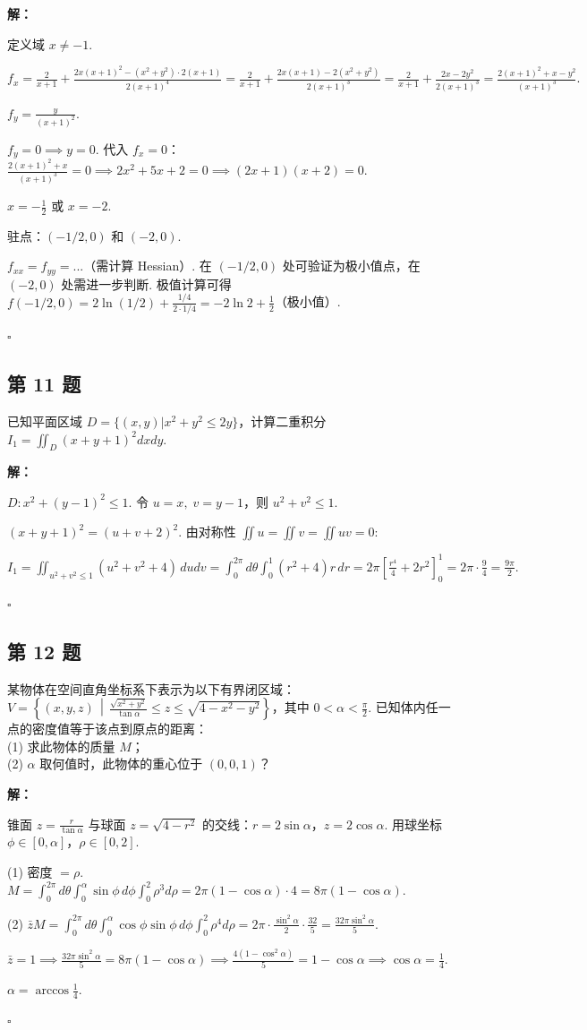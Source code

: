 \documentclass[12pt,a4paper]{article}
\newenvironment{sol}[1][解]{%
  \par\medskip\noindent\textbf{#1：}\itshape\par\noindent\ignorespaces
}{%
  \par\hfill$\square$\par\medskip
}
\begin{document}
\begin{sol}定义域 $x\ne -1$.

  $f_x=\frac{2}{x+1}+\frac{2x(x+1)^2-(x^2+y^2)\cdot
  2(x+1)}{2(x+1)^4}=\frac{2}{x+1}+\frac{2x(x+1)-2(x^2+y^2)}{2(x+1)^3}=\frac{2}{x+1}+\frac{2x-2y^2}{2(x+1)^3}=\frac{2(x+1)^2+x-y^2}{(x+1)^3}.$

  $f_y=\frac{y}{(x+1)^2}$.

  $f_y=0\implies y=0$. 代入 $f_x=0$：$\frac{2(x+1)^2+x}{(x+1)^3}=0\implies
  2x^2+5x+2=0\implies(2x+1)(x+2)=0$.

  $x=-\frac{1}{2}$ 或 $x=-2$.

  驻点：$(-1/2,0)$ 和 $(-2,0)$.

  $f_{xx}=f_{yy}=...$（需计算 Hessian）. 在 $(-1/2,0)$ 处可验证为极小值点，在 $(-2,0)$
  处需进一步判断. 极值计算可得 $f(-1/2,0)=2\ln(1/2)+\frac{1/4}{2\cdot 1/4}=-2\ln
  2+\frac{1}{2}$（极小值）.

\end{sol}
\subsection*{第 11 题}
已知平面区域 $D=\{(x,y)|x^2+y^2\le 2y\}$，计算二重积分 $I_1=\iint_{D}(x+y+1)^2dxdy$.

\begin{sol}$D: x^2+(y-1)^2\le 1$. 令 $u=x,\; v=y-1$，则 $u^2+v^2\le 1$.

  $(x+y+1)^2=(u+v+2)^2$. 由对称性 $\iint u=\iint v=\iint uv=0$:

  $I_1=\iint_{u^2+v^2\le
  1}(u^2+v^2+4)\,dudv=\int_0^{2\pi}d\theta\int_0^1(r^2+4)r\,dr=2\pi\left[\frac{r^4}{4}+2r^2\right]_0^1=2\pi\cdot\frac{9}{4}=\frac{9\pi}{2}.$

\end{sol}
\subsection*{第 12 题}
某物体在空间直角坐标系下表示为以下有界闭区域：$V=\left\{(x,y,z)\,\middle|\,\frac{\sqrt{x^2+y^2}}{\tan\alpha}\le
z\le\sqrt{4-x^2-y^2}\right\}$，其中 $0<\alpha<\frac{\pi}{2}$.
已知体内任一点的密度值等于该点到原点的距离：\\
(1) 求此物体的质量 $M$；\\
(2) $\alpha$ 取何值时，此物体的重心位于 $(0,0,1)$？

\begin{sol}锥面 $z=\frac{r}{\tan\alpha}$ 与球面 $z=\sqrt{4-r^2}$
  的交线：$r=2\sin\alpha$，$z=2\cos\alpha$. 用球坐标 $\phi\in[0,\alpha]$，$\rho\in[0,2]$.

  (1) 密度 $=\rho$.
  $M=\int_0^{2\pi}d\theta\int_0^{\alpha}\sin\phi\,d\phi\int_0^2\rho^3d\rho=2\pi(1-\cos\alpha)\cdot
  4=8\pi(1-\cos\alpha).$

  (2)
  $\bar{z}M=\int_0^{2\pi}d\theta\int_0^{\alpha}\cos\phi\sin\phi\,d\phi\int_0^2\rho^4d\rho=2\pi\cdot\frac{\sin^2\alpha}{2}\cdot\frac{32}{5}=\frac{32\pi\sin^2\alpha}{5}$.

  $\bar{z}=1\implies\frac{32\pi\sin^2\alpha}{5}=8\pi(1-\cos\alpha)\implies\frac{4(1-\cos^2\alpha)}{5}=1-\cos\alpha\implies\cos\alpha=\frac{1}{4}.$

  $\alpha=\arccos\frac{1}{4}.$

\end{sol}
\end{document}
